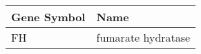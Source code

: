 \begin{tabular}{ll}
\toprule
Gene Symbol &               Name \\
\midrule
         FH & fumarate hydratase \\
\bottomrule
\end{tabular}
